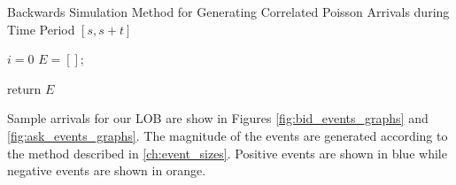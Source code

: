 \begin{algorithm}[H]
\label{alg:backwards_simulation}
\SetAlgoLined
\caption{Backwards Simulation Method for Generating Correlated Poisson Arrivals during Time Period $[s, s+t]$}
 $i = 0$\;
 $E = []$;
 
 \While{$i \cdot t < T$}{
  Generate $(n_1, n_2, \ldots, n_d)$ with means $()$ using procedure described in section \ref{ch:generate_correlated_poisson};
  
  \For{$j = 1, \ldots, d$} {
  
    \For{$n = 1, \ldots, n_j$} {
        Generate a uniform random variable $u \in [it, (i+1)t)$;
        Generate a variable $y$ that is distributed exponentially with mean $\mu_j$
        Append $(j,y,u)$ to $E$;
    }
  
  }
 }
 return $E$ \;
\end{algorithm}

Sample arrivals for our LOB are show in Figures \ref{fig:bid_events_graphs} and \ref{fig:ask_events_graphs}. The magnitude of the events are generated according to the method described in \ref{ch:event_sizes}. Positive events are shown in blue while negative events are shown in orange.

